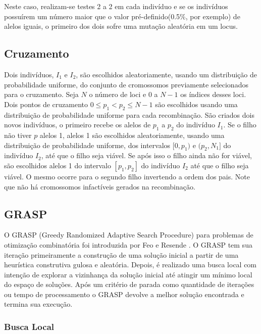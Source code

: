 \documentclass[12pt,a4paper]{article}
\begin{document}
        Neste caso, realizam-se testes 2 a 2 em cada indivíduo e se os indivíduos possuírem um número maior que o valor pré-definido(0.5$\%$, por exemplo) de alelos iguais, o primeiro dos
        dois sofre uma mutação aleatória em um locus.

    \subsection{Cruzamento}

        Dois indivíduos, $I_1$ e $I_2$, são escolhidos aleatoriamente, usando um distribuição de probabilidade uniforme, do conjunto de cromossomos previamente selecionados para o cruzamento. Seja
        $N$ o número de loci e $0$ a $N-1$ os índices desses loci. Dois pontos de cruzamento $0 \le p_1 < p_2 \le N-1$ são escolhidos usando uma distribuição de probabilidade uniforme para cada
        recombinação. São criados dois novos indivíduos, o primeiro recebe os alelos de $p_1$ a $p_2$ do indivíduo $I_1$. Se o filho não tiver $p$ alelos 1, alelos 1 são escolhidos aleatoriamente,
        usando uma distribuição de probabilidade uniforme, dos intervalos $[0, p_1)$ e $(p_2, N_1]$ do indivíduo $I_2$, até que o filho seja viável. Se após isso o filho ainda não for viável, são
        escolhidos alelos 1 do intervalo $[p_1, p_2]$ do indivíduo $I_2$ até que o filho seja viável. O mesmo ocorre para o segundo filho invertendo a ordem dos pais. Note que não há cromossomos
        infactíveis gerados na recombinação. 

\subsection{GRASP}
    O GRASP (Greedy Randomized Adaptive Search Procedure) para problemas de otimização combinatória foi introduzida por Feo e Resende \cite{feo1989probabilistic}. O GRASP tem sua iteração
    primeiramente a construção de uma solução inicial a partir de uma heurística construtiva gulosa e aleatória. Depois, é realizado uma busca local com intenção de explorar a vizinhança da
    solução inicial até atingir um mínimo local do espaço de soluções. Após um critério de parada como quantidade de iterações ou tempo de processamento o GRASP devolve a melhor solução
    encontrada e termina sua execução.



    \subsubsection{Busca Local}
\end{document}
